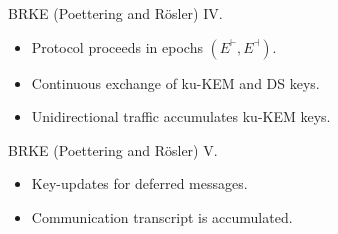 \documentclass{beamer}
\begin{document}
\begin{frame}{BRKE (Poettering and Rösler) IV.}
  \scriptsize
  \begin{figure}[h]
        \centering
        \setlength{\fboxsep}{10pt}
        \scalebox{0.6}{%
        \fbox{%
          
        }
      }
    \end{figure}
       \begin{itemize}
       \item Protocol proceeds in epochs $(E^\vdash,E^\dashv)$.
       \item Continuous exchange of ku-KEM and DS keys.
       \item Unidirectional traffic accumulates ku-KEM keys.
       \end{itemize}


\end{frame}

\begin{frame}{BRKE (Poettering and Rösler) V.}
  \scriptsize
    \begin{figure}[h]
        \centering
        \setlength{\fboxsep}{10pt}
        \scalebox{0.6}{%
        \fbox{%
          
        }
      }
   \end{figure}
       \begin{itemize}
       \item Key-updates for deferred messages.
       \item Communication transcript is accumulated.
       \end{itemize}
\end{frame}
\end{document}
